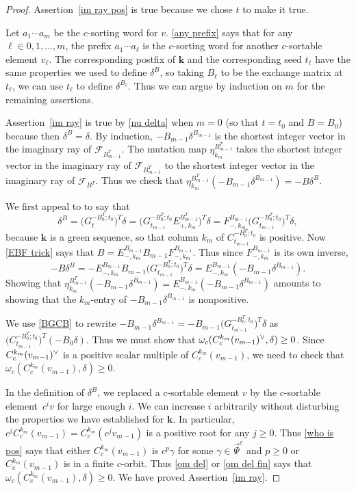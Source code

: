 \documentclass{amsart}
\theoremstyle{definition}
\theoremstyle{remark}
\numberwithin{equation}{section}
\newcommand{\F}{{\mathcal F}}
\newcommand{\ck}{\spcheck}
\newcommand{\0}{{\mathbf{0}}}
\newcommand{\kk}{\mathbf{k}}
\newcommand{\TravInfChar}{\Psi}
\newcommand{\TravProj}[1]{\overrightarrow{\TravInfChar}^{#1}}
\begin{document}
\begin{proof}%
Assertion~\ref{im ray pos} is true because we chose $t$ to make it true.

Let $a_1\cdots a_m$ be the $c$-sorting word for $v$.
\cref{any prefix} says that for any $\ell\in{0,1,\ldots,m}$, the prefix $a_1\cdots a_\ell$ is the $c$-sorting word for another $c$-sortable element $v_\ell$.
The corresponding postfix of $\kk$ and the corresponding seed $t_\ell$ have the same properties we used to define $\delta^B$, so taking $B_\ell$ to be the exchange matrix at $t_\ell$, we can use $t_\ell$ to define $\delta^{B_\ell}$.
Thus we can argue by induction on $m$ for the remaining assertions.

Assertion~\ref{im ray} is true by \cref{nu delta} when $m=0$ (so that $t=t_0$ and $B=B_0$) because then $\delta^B=\delta$.
By induction, $-B_{m-1}\delta^{B_{m-1}}$ is the shortest integer vector in the imaginary ray of $\F_{B_{m-1}^T}$.
The mutation map $\eta_{k_m}^{B_{m-1}^T}$ takes the shortest integer vector in the imaginary ray of $\F_{B_{m-1}^T}$ to the shortest integer vector in the imaginary ray of $\F_{B^T}$. 
Thus we check that $\eta_{k_m}^{B_{m-1}^T}(-B_{m-1}\delta^{B_{m-1}})=-B\delta^{B}$.

We first appeal to \cite[Proposition~1.3]{NZ} to say that 
\[\delta^B=\bigl(G_t^{-B_0^T;t_0}\bigr)^T\delta=\bigl(G_{t_{m-1}}^{-B_0^T;t_0}E_{+,k_m}^{B_{m-1}^T}\bigr)^T\delta=F_{-,k_m}^{B_{m-1}}\bigl(G_{t_{m-1}}^{-B_0^T;t_0}\bigr)^T\delta,\]
because $\kk$ is a green sequence, so that column $k_m$ of $C_{t_{m-1}}^{-B_0^T;t_0}$ is positive.
Now \cref{EBF trick} says that $B=E_{-,k_m}^{B_{m-1}}B_{m-1}F_{-,k_m}^{B_{m-1}}$.
Thus since $F_{-,k_m}^{B_{m-1}}$ is its own inverse, 
\[-B\delta^B=-E_{-,k_m}^{B_{m-1}}B_{m-1}\bigl(G_{t_{m-1}}^{-B_0^T;t_0}\bigr)^T\delta=E_{-,k_m}^{B_{m-1}}(-B_{m-1}\delta^{B_{m-1}}).\]
Showing that $\eta_{k_m}^{B_{m-1}^T}(-B_{m-1}\delta^{B_{m-1}})=E_{-,k_m}^{B_{m-1}}(-B_{m-1}\delta^{B_{m-1}})$ amounts to showing that the $k_m$-entry of $-B_{m-1}\delta^{B_{m-1}}$ is nonpositive.

We use \cref{BGCB} to rewrite $-B_{m-1}\delta^{B_{m-1}}=-B_{m-1}\bigl(G_{t_{m-1}}^{-B_0^T;t_0}\bigr)^T\delta$ as $\bigl(C_{t_{m-1}}^{-B_0^T;t_0}\bigr)^T(-B_0\delta)$.
Thus we must show that $\omega_c(C^{k_m}_c(v_{m-1})\ck,\delta)\ge0$. 
Since $C^{k_m}_c(v_{m-1})\ck$ is a positive scalar multiple of $C^{k_m}_c(v_{m-1})$, we need to check that $\omega_c(C^{k_m}_c(v_{m-1}),\delta)\ge0$. 

In the definition of $\delta^B$, we replaced a $c$-sortable element $v$ by the $c$-sortable element~$c^iv$ for large enough $i$.
We can increase $i$ arbitrarily without disturbing the properties we have established for $\kk$.
In particular, $c^jC^{k_m}_c(v_{m-1})=C^{k_m}_c(c^jv_{m-1})$ is a positive root for any $j\ge0$.
Thus \cref{who is pos} says that either $C^{k_m}_c(v_{m-1})$ is $c^p\gamma$ for some $\gamma\in\TravProj{c}$ and $p\ge0$ or $C^{k_m}_c(v_{m-1})$ is in a finite $c$-orbit.
Thus \cref{om del} or \cref{om del fin} says that $\omega_c(C^{k_m}_c(v_{m-1}),\delta)\ge0$. 
We have proved Assertion~\ref{im ray}.


\end{proof}
\end{document}
